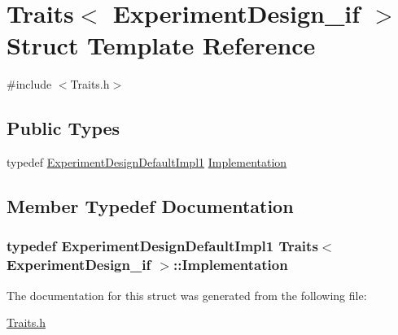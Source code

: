 \hypertarget{struct_traits_3_01_experiment_design__if_01_4}{}\section{Traits$<$ Experiment\+Design\+\_\+if $>$ Struct Template Reference}
\label{struct_traits_3_01_experiment_design__if_01_4}


{\ttfamily \#include $<$Traits.\+h$>$}

\subsection*{Public Types}
\begin{DoxyCompactItemize}
\item 
typedef \hyperlink{class_experiment_design_default_impl1}{Experiment\+Design\+Default\+Impl1} \hyperlink{struct_traits_3_01_experiment_design__if_01_4_aaa7a813163d391af2de0fd96f952c714}{Implementation}
\end{DoxyCompactItemize}


\subsection{Member Typedef Documentation}
\subsubsection[{\texorpdfstring{Implementation}{Implementation}}]{\setlength{\rightskip}{0pt plus 5cm}typedef {\bf Experiment\+Design\+Default\+Impl1} {\bf Traits}$<$ {\bf Experiment\+Design\+\_\+if} $>$\+::{\bf Implementation}}\hypertarget{struct_traits_3_01_experiment_design__if_01_4_aaa7a813163d391af2de0fd96f952c714}{}\label{struct_traits_3_01_experiment_design__if_01_4_aaa7a813163d391af2de0fd96f952c714}


The documentation for this struct was generated from the following file\+:\begin{DoxyCompactItemize}
\item 
\hyperlink{_traits_8h}{Traits.\+h}\end{DoxyCompactItemize}
